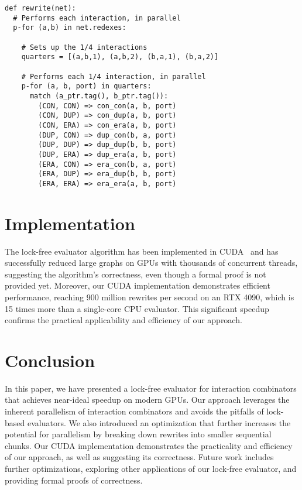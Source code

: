 \documentclass{article}
\begin{document}
\begin{lstlisting}
def rewrite(net):
  # Performs each interaction, in parallel
  p-for (a,b) in net.redexes:

    # Sets up the 1/4 interactions
    quarters = [(a,b,1), (a,b,2), (b,a,1), (b,a,2)]

    # Performs each 1/4 interaction, in parallel
    p-for (a, b, port) in quarters:
      match (a_ptr.tag(), b_ptr.tag()):
        (CON, CON) => con_con(a, b, port)
        (CON, DUP) => con_dup(a, b, port)
        (CON, ERA) => con_era(a, b, port)
        (DUP, CON) => dup_con(b, a, port)
        (DUP, DUP) => dup_dup(b, b, port)
        (DUP, ERA) => dup_era(a, b, port)
        (ERA, CON) => era_con(b, a, port)
        (ERA, DUP) => era_dup(b, b, port)
        (ERA, ERA) => era_era(a, b, port)
\end{lstlisting}

\section{Implementation}\label{s:implementation}

The lock-free evaluator algorithm has been implemented in CUDA~\cite{taelin2022lock} and has successfully reduced large graphs on GPUs with thousands of concurrent threads, suggesting the algorithm's correctness, even though a formal proof is not provided yet. Moreover, our CUDA implementation demonstrates efficient performance, reaching 900 million rewrites per second on an RTX 4090, which is 15 times more than a single-core CPU evaluator. This significant speedup confirms the practical applicability and efficiency of our approach.

\section{Conclusion}\label{s:conclusion}

In this paper, we have presented a lock-free evaluator for interaction combinators that achieves near-ideal speedup on modern GPUs. Our approach leverages the inherent parallelism of interaction combinators and avoids the pitfalls of lock-based evaluators. We also introduced an optimization that further increases the potential for parallelism by breaking down rewrites into smaller sequential chunks. Our CUDA implementation demonstrates the practicality and efficiency of our approach, as well as suggesting its correctness. Future work includes further optimizations, exploring other applications of our lock-free evaluator, and providing formal proofs of correctness.
\end{document}

